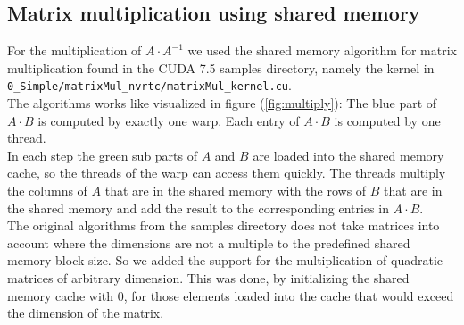 \subsection*{Matrix multiplication using shared memory}
For the multiplication of $A \cdot A^{-1}$ we used the shared memory algorithm for matrix multiplication found in the CUDA 7.5 samples directory, namely the kernel in \texttt{0\_Simple/matrixMul\_nvrtc/matrixMul\_kernel.cu}.\\
The algorithms works like visualized in figure (\ref{fig:multiply}):
The blue part of $A \cdot B$ is computed by exactly one warp. Each entry of $A \cdot B$ is computed by one thread.\\ 
In each step the green sub parts of $A$ and $B$ are loaded into the shared memory cache, so the threads of the warp can access them quickly. The threads multiply the columns of $A$ that are in the shared memory with the rows of $B$ that are in the shared memory and add the result to the corresponding entries in $A \cdot B$.
\vspace{0.3cm}\\
The original algorithms from the samples directory does not take matrices into account where the dimensions are not a multiple to the predefined shared memory block size. So we added the support for the multiplication of quadratic matrices of arbitrary dimension. This was done, by initializing the shared memory cache with 0, for those elements loaded into the cache that would exceed the dimension of the matrix.
